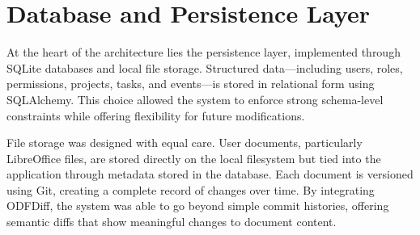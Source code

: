 \documentclass{report}
\begin{document}
\section{Database and Persistence Layer}

At the heart of the architecture lies the persistence layer, implemented through SQLite databases and local file storage. 
Structured data—including users, roles, permissions, projects, tasks, and events—is stored in relational form using SQLAlchemy. 
This choice allowed the system to enforce strong schema-level constraints while offering flexibility for future modifications.

File storage was designed with equal care. 
User documents, particularly LibreOffice files, are stored directly on the local filesystem but tied into the application through metadata stored in the database. 
Each document is versioned using Git, creating a complete record of changes over time. 
By integrating ODFDiff, the system was able to go beyond simple commit histories, offering semantic diffs that show meaningful changes to document content.
\end{document}
